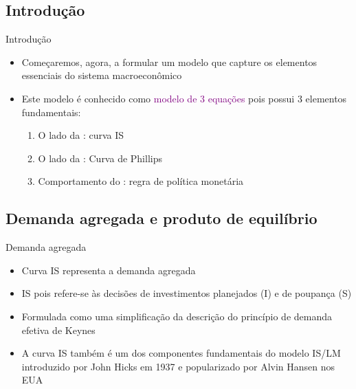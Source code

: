 \documentclass[10pt]{beamer}
\begin{document}
\subsection{Introdução}
\begin{frame}{Introdução}
    \begin{itemize}
        \item Começaremos, agora, a formular um modelo que capture os elementos essenciais do sistema macroeconômico\bigskip
         
        \item Este modelo é conhecido como \textcolor{purple}{modelo de 3 equações} pois possui 3 elementos fundamentais:\bigskip
         
        \begin{enumerate}
            \item O lado da : curva IS\medskip
             
            \item O lado da : Curva de Phillips\medskip
             
            \item Comportamento do : regra de política monetária
        \end{enumerate}
    \end{itemize}
\end{frame}

\subsection{Demanda agregada e produto de equilíbrio}
\begin{frame}{Demanda agregada}
    \begin{itemize}
        \item Curva IS representa a demanda agregada\bigskip
         
        \item IS pois refere-se às decisões de investimentos planejados (I) e de poupança (S)\bigskip
         
        \item Formulada como uma simplificação da descrição do princípio de demanda efetiva de Keynes\bigskip
         
        \item A curva IS também é um dos componentes fundamentais do modelo IS/LM introduzido por John Hicks em 1937 e popularizado por Alvin Hansen nos EUA
    \end{itemize}
\end{frame}
\end{document}
